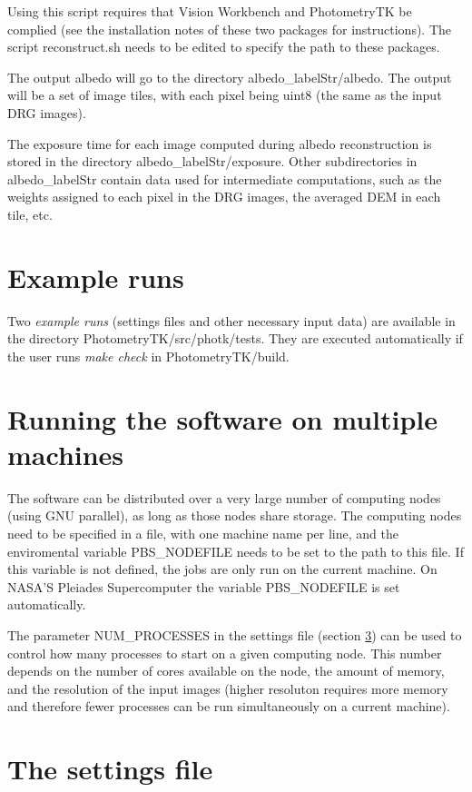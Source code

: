 \documentclass[letterpaper,fleqn,11pt]{report}
\begin{document}
Using this script requires that Vision Workbench and PhotometryTK be
complied (see the installation notes of these two packages for
instructions). The script reconstruct.sh needs to be edited to specify the 
path to these packages.

The output albedo will go to the directory
albedo\_labelStr/albedo. The output will be a set of image tiles, with each
pixel being uint8 (the same as the input DRG images).

The exposure time for each image computed during albedo reconstruction is
stored in the directory albedo\_labelStr/exposure. Other subdirectories
in albedo\_labelStr contain data used for intermediate computations,
such as the weights assigned to each pixel in the DRG images, the averaged DEM in each
tile, etc.

\section{Example runs}

Two {\it example runs} (settings files and other necessary input data)
are available in the directory PhotometryTK/src/photk/tests. They are executed automatically if the user
runs {\it make check} in PhotometryTK/build.


\section{Running the software on multiple machines}

The software can be distributed over a very large number of computing
nodes (using GNU parallel), as long as those nodes share storage. The
computing nodes need to be specified in a file, with one machine name
per line, and the enviromental variable PBS\_NODEFILE needs to be set to
the path to this file. If this variable is not defined, the jobs are
only run on the current machine. On NASA'S Pleiades Supercomputer the
variable PBS\_NODEFILE is set automatically.
 
The parameter NUM\_PROCESSES in the settings file (section \ref{settings}) can be used
to control how many processes to start on a given computing node. This number depends
on the number of cores available on the node, the amount of memory, and the resolution of the input images
(higher resoluton requires more memory and therefore fewer processes can be run simultaneously on a current machine).

\section{The settings file}\label{settings}
\end{document}
